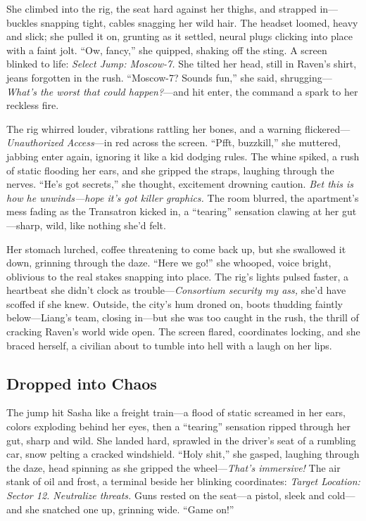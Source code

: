 \documentclass[12pt]{book}
\begin{document}
She climbed into the rig, the seat hard against her thighs, and strapped in—buckles snapping tight, cables snagging her wild hair. The headset loomed, heavy and slick; she pulled it on, grunting as it settled, neural plugs clicking into place with a faint jolt. “Ow, fancy,” she quipped, shaking off the sting. A screen blinked to life: \textit{Select Jump: Moscow-7.} She tilted her head, still in Raven’s shirt, jeans forgotten in the rush. “Moscow-7? Sounds fun,” she said, shrugging—\textit{What’s the worst that could happen?}—and hit enter, the command a spark to her reckless fire.

The rig whirred louder, vibrations rattling her bones, and a warning flickered—\textit{Unauthorized Access}—in red across the screen. “Pfft, buzzkill,” she muttered, jabbing enter again, ignoring it like a kid dodging rules. The whine spiked, a rush of static flooding her ears, and she gripped the straps, laughing through the nerves. “He’s got secrets,” she thought, excitement drowning caution. \textit{Bet this is how he unwinds—hope it’s got killer graphics.} The room blurred, the apartment’s mess fading as the Transatron kicked in, a “tearing” sensation clawing at her gut—sharp, wild, like nothing she’d felt.

Her stomach lurched, coffee threatening to come back up, but she swallowed it down, grinning through the daze. “Here we go!” she whooped, voice bright, oblivious to the real stakes snapping into place. The rig’s lights pulsed faster, a heartbeat she didn’t clock as trouble—\textit{Consortium security my ass,} she’d have scoffed if she knew. Outside, the city’s hum droned on, boots thudding faintly below—Liang’s team, closing in—but she was too caught in the rush, the thrill of cracking Raven’s world wide open. The screen flared, coordinates locking, and she braced herself, a civilian about to tumble into hell with a laugh on her lips.

\subsection{Dropped into Chaos}

The jump hit Sasha like a freight train—a flood of static screamed in her ears, colors exploding behind her eyes, then a “tearing” sensation ripped through her gut, sharp and wild. She landed hard, sprawled in the driver’s seat of a rumbling car, snow pelting a cracked windshield. “Holy shit,” she gasped, laughing through the daze, head spinning as she gripped the wheel—\textit{That’s immersive!} The air stank of oil and frost, a terminal beside her blinking coordinates: \textit{Target Location: Sector 12. Neutralize threats.} Guns rested on the seat—a pistol, sleek and cold—and she snatched one up, grinning wide. “Game on!”
\end{document}
